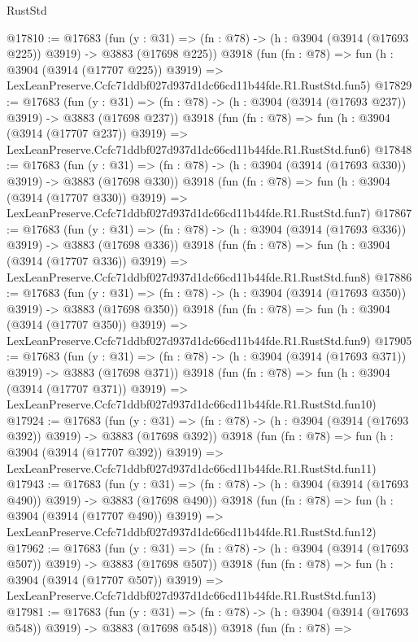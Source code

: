 \begin{lexlean}{RustStd}
\begin{coremodule}
@17810 := @17683
    (fun (y : @31) => (fn : @78) -> (h : @3904 (@3914 (@17693 @225)) @3919) -> @3883 (@17698 @225))
    @3918
    (fun (fn : @78) =>
    fun (h : @3904 (@3914 (@17707 @225)) @3919) =>
    LexLeanPreserve.Ccfc71ddbf027d937d1dc66cd11b44fde.R1.RustStd.fun5)
@17829 := @17683
    (fun (y : @31) => (fn : @78) -> (h : @3904 (@3914 (@17693 @237)) @3919) -> @3883 (@17698 @237))
    @3918
    (fun (fn : @78) =>
    fun (h : @3904 (@3914 (@17707 @237)) @3919) =>
    LexLeanPreserve.Ccfc71ddbf027d937d1dc66cd11b44fde.R1.RustStd.fun6)
@17848 := @17683
    (fun (y : @31) => (fn : @78) -> (h : @3904 (@3914 (@17693 @330)) @3919) -> @3883 (@17698 @330))
    @3918
    (fun (fn : @78) =>
    fun (h : @3904 (@3914 (@17707 @330)) @3919) =>
    LexLeanPreserve.Ccfc71ddbf027d937d1dc66cd11b44fde.R1.RustStd.fun7)
@17867 := @17683
    (fun (y : @31) => (fn : @78) -> (h : @3904 (@3914 (@17693 @336)) @3919) -> @3883 (@17698 @336))
    @3918
    (fun (fn : @78) =>
    fun (h : @3904 (@3914 (@17707 @336)) @3919) =>
    LexLeanPreserve.Ccfc71ddbf027d937d1dc66cd11b44fde.R1.RustStd.fun8)
@17886 := @17683
    (fun (y : @31) => (fn : @78) -> (h : @3904 (@3914 (@17693 @350)) @3919) -> @3883 (@17698 @350))
    @3918
    (fun (fn : @78) =>
    fun (h : @3904 (@3914 (@17707 @350)) @3919) =>
    LexLeanPreserve.Ccfc71ddbf027d937d1dc66cd11b44fde.R1.RustStd.fun9)
@17905 := @17683
    (fun (y : @31) => (fn : @78) -> (h : @3904 (@3914 (@17693 @371)) @3919) -> @3883 (@17698 @371))
    @3918
    (fun (fn : @78) =>
    fun (h : @3904 (@3914 (@17707 @371)) @3919) =>
    LexLeanPreserve.Ccfc71ddbf027d937d1dc66cd11b44fde.R1.RustStd.fun10)
@17924 := @17683
    (fun (y : @31) => (fn : @78) -> (h : @3904 (@3914 (@17693 @392)) @3919) -> @3883 (@17698 @392))
    @3918
    (fun (fn : @78) =>
    fun (h : @3904 (@3914 (@17707 @392)) @3919) =>
    LexLeanPreserve.Ccfc71ddbf027d937d1dc66cd11b44fde.R1.RustStd.fun11)
@17943 := @17683
    (fun (y : @31) => (fn : @78) -> (h : @3904 (@3914 (@17693 @490)) @3919) -> @3883 (@17698 @490))
    @3918
    (fun (fn : @78) =>
    fun (h : @3904 (@3914 (@17707 @490)) @3919) =>
    LexLeanPreserve.Ccfc71ddbf027d937d1dc66cd11b44fde.R1.RustStd.fun12)
@17962 := @17683
    (fun (y : @31) => (fn : @78) -> (h : @3904 (@3914 (@17693 @507)) @3919) -> @3883 (@17698 @507))
    @3918
    (fun (fn : @78) =>
    fun (h : @3904 (@3914 (@17707 @507)) @3919) =>
    LexLeanPreserve.Ccfc71ddbf027d937d1dc66cd11b44fde.R1.RustStd.fun13)
@17981 := @17683
    (fun (y : @31) => (fn : @78) -> (h : @3904 (@3914 (@17693 @548)) @3919) -> @3883 (@17698 @548))
    @3918
    (fun (fn : @78) =>

\end{coremodule}
\end{lexlean}
